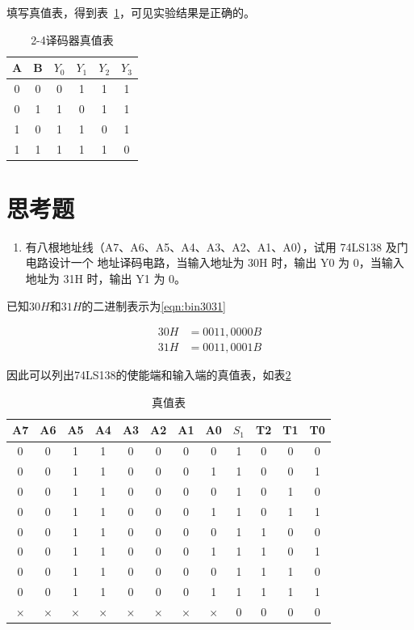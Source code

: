 \documentclass[a4paper,twoside]{ctexart}
\begin{document}
\begin{spacing}{1.2}
填写真值表，得到表~\ref{tbl:resdec24}，可见实验结果是正确的。

\begin{table}[htbp]
	\centering
	\caption{2-4译码器真值表}
	\label{tbl:resdec24}
	\begin{tabular}{cc|cccc}
		\toprule
		\hline
		A&B&$Y_0$&$Y_1$&$Y_2$&$Y_3$\\
		\hline
		0&0&0&1&1&1\\
		0&1&1&0&1&1\\
		1&0&1&1&0&1\\
		1&1&1&1&1&0\\
		\hline
		\bottomrule
	\end{tabular}
\end{table}

\section{思考题}

\begin{enumerate}
	\item 有八根地址线（A7、A6、A5、A4、A3、A2、A1、A0），试用 74LS138 及门电路设计一个
	地址译码电路，当输入地址为 30H 时，输出 Y0 为 0，当输入地址为 31H 时，输出 Y1 为 0。	
\end{enumerate}

已知$30H$和$31H$的二进制表示为\eqref{eqn:bin3031}

\begin{equation}
	\label{eqn:bin3031}
	\begin{aligned}
		30H&=0011,0000B\\
		31H&=0011,0001B
	\end{aligned}
\end{equation}

因此可以列出74LS138的使能端和输入端的真值表，如表\ref{tbl:dec}

\begin{table}[htbp]
	\centering
	\caption{真值表}
	\label{tbl:dec}
	\begin{tabular}{cccccccc|cccc}
		\toprule
		\hline
		A7&A6&A5&A4&A3&A2&A1&A0&$S_1$&T2&T1&T0\\
		\hline
		0&0&1&1&0&0&0&0&1&0&0&0\\
		0&0&1&1&0&0&0&1&1&0&0&1\\
		0&0&1&1&0&0&0&0&1&0&1&0\\
		0&0&1&1&0&0&0&1&1&0&1&1\\
		0&0&1&1&0&0&0&0&1&1&0&0\\
		0&0&1&1&0&0&0&1&1&1&0&1\\
		0&0&1&1&0&0&0&0&1&1&1&0\\
		0&0&1&1&0&0&0&1&1&1&1&1\\
		$\times$&$\times$&$\times$&$\times$&$\times$&$\times$&$\times$&$\times$&0&0&0&0\\
		\hline
		\bottomrule
	\end{tabular}
\end{table}


\end{spacing}
\end{document}
